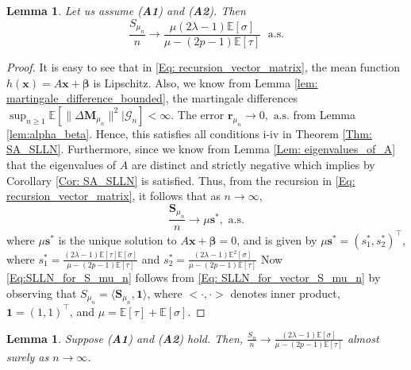 \documentclass{article}
\numberwithin{equation}{section}
\newtheorem{lemma}[theorem]{Lemma}
\newcommand{\GG}{\mbox{${\mathcal G}$}}
\newcommand{\1}{\mathbf{1}}
\newcommand{\0}{\mathbf{0}}
\newcommand{\bS}{\mathbf{S}}
\newcommand{\bM}{\mathbf{M}}
\newcommand{\br}{\mathbf{r}}
\newcommand{\bs}{\mathbf{s}}
\newcommand{\E}{\mbox{${\mathbb E}$}}
\begin{document}
\begin{lemma}
\label{Lem: SLLN_for_S_mu_n}
Let us assume (\textbf{A1}) and (\textbf{A2}). Then 
\begin{equation}
\label{Eq:SLLN_for_S_mu_n}
\frac{S_{\mu_{n}}}{n} \longrightarrow \frac{\mu (2\lambda-1)\E[\sigma]}{\mu - (2p-1)\E[\tau]} \; \text{ a.s.}
\end{equation}
\end{lemma}
\begin{proof}
It is easy to see that in \eqref{Eq: recursion_vector_matrix}, the mean function $h(\mathbf{x})= A \mathbf{x} +\boldsymbol{\beta}$ is Lipschitz. Also, we know from Lemma \ref{lem: martingale_difference_bounded}, the martingale differences
$\sup_{n \ge 1} \E \left[\lVert \Delta \bM_{ \mu_{n}}\rVert ^2 \vert \GG_n\right]<\infty$. The error $\br_{ \mu_{n}} \longrightarrow 0, \text{ a.s.}$ from Lemma \ref{lem:alpha_beta}. Hence, this satisfies all conditions i-iv in Theorem \ref{Thm: SA_SLLN}. Furthermore, since we know from Lemma \ref{Lem: eigenvalues_of_A} that the eigenvalues of $A$ are distinct and strictly negative which implies by Corollary \ref{Cor: SA_SLLN} is satisfied. 
Thus, from the recursion in \eqref{Eq: recursion_vector_matrix}, it follows that as $n \to \infty$, 
\begin{equation}
\label{Eq: SLLN_for_vector_S_mu_n}
\frac{\bS_{\mu_{n}}}{n} \longrightarrow \mu \bs^*, \text{ a.s.}
\end{equation}
where $\mu \bs^*$ is the unique solution to $A \mathbf{x} + \boldsymbol{\beta} =0$, and is given by $\mu \bs^*= \left(s_1^*, s_2^*\right)^\top$, where $s_1^*= \frac{ (2\lambda-1)\E\left[\tau \right]\E[\sigma]}{\mu - (2p-1)\E[\tau]} $ and $s_2^*= \frac{ (2\lambda-1)\E^2[\sigma]}{\mu - (2p-1)\E[\tau]}$
Now \eqref{Eq:SLLN_for_S_mu_n} follows from \eqref{Eq: SLLN_for_vector_S_mu_n} by observing that $S_{\mu_n}= \langle \bS_{\mu_{n}}, \mathbf{1} \rangle$, where $<\cdot, \cdot>$ denotes inner product, $\mathbf{1}= \left(1,1\right)^\top$, and $\mu = \E \left[\tau\right]+ \E \left[\sigma\right]$. 
\end{proof}
\begin{lemma}\label{lem:concludinglemma}
Suppose (\textbf{A1}) and (\textbf{A2}) hold. Then, $\frac{S_n}{n} \to \frac{(2\lambda-1)\E[\sigma]}{\mu - (2p-1)\E[\tau]}$ almost surely as $n \to \infty$.
\end{lemma}
\end{document}
